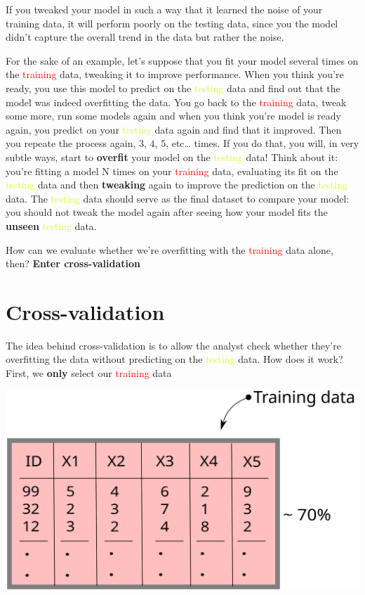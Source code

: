 \documentclass[
]{book}
\begin{document}
If you tweaked your model in such a way that it learned the noise of your training data, it will perform poorly on the testing data, since you the model didn't capture the overall trend in the data but rather the noise.

For the sake of an example, let's suppose that you fit your model several times on the \textcolor{red}{training} data, tweaking it to improve performance. When you think you're ready, you use this model to predict on the \textcolor{#D4FF2A}{testing} data and find out that the model was indeed overfitting the data. You go back to the \textcolor{red}{training} data, tweak some more, run some models again and when you think you're model is ready again, you predict on your \textcolor{#D4FF2A}{testing} data again and find that it improved. Then you repeate the process again, \(3\), \(4\), \(5\), etc\ldots{} times. If you do that, you will, in very subtle ways, start to \textbf{overfit} your model on the \textcolor{#D4FF2A}{testing} data! Think about it: you're fitting a model N times on your \textcolor{red}{training} data, evaluating its fit on the \textcolor{#D4FF2A}{testing} data and then \textbf{tweaking} again to improve the prediction on the \textcolor{#D4FF2A}{testing} data. The \textcolor{#D4FF2A}{testing} data should serve as the final dataset to compare your model: you should not tweak the model again after seeing how your model fits the \textbf{unseen} \textcolor{#D4FF2A}{testing} data.

How can we evaluate whether we're overfitting with the \textcolor{red}{training} data alone, then? \textbf{Enter cross-validation}

\hypertarget{cross-validation}{%
\section{Cross-validation}\label{cross-validation}}

The idea behind cross-validation is to allow the analyst check whether they're overfitting the data without predicting on the \textcolor{#D4FF2A}{testing} data. How does it work? First, we \textbf{only} select our \textcolor{red}{training} data

\begin{center}\includegraphics[width=0.5\linewidth]{./img/training_df} \end{center}
\end{document}
